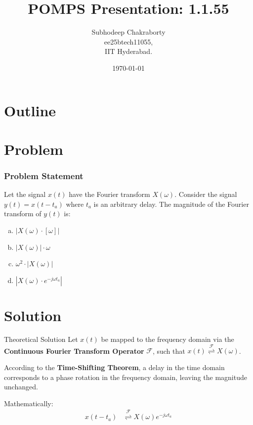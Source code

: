 \documentclass{beamer}
\title{POMPS Presentation: 1.1.55}
\author{Subhodeep Chakraborty \\ ee25btech11055,\\IIT Hyderabad.}
\date{\today}
\theoremstyle{remark}
\providecommand{\abs}[1]{\left\vert#1\right\vert}
\providecommand{\fourier}{\overset{\mathcal{F}}{ \rightleftharpoons}}
\numberwithin{equation}{section}
\begin{document}
\begin{frame}
\titlepage
\end{frame}

\section*{Outline}
\begin{frame}
\tableofcontents
\end{frame}

\section{Problem}
\begin{frame}
\frametitle{Problem Statement}
Let the signal $x(t)$ have the Fourier transform $X(\omega)$.
Consider the signal $y(t) = x(t-t_a)$ where $t_a$ is an arbitrary delay.
The magnitude of the Fourier transform of $y(t)$ is:
\vspace{0.5cm}
\begin{enumerate}[(a)]
    \item $\abs{X(\omega) \cdot [\omega]}$
    \item $\abs{X(\omega)} \cdot \omega$
    \item $\omega^2 \cdot \abs{X(\omega)}$
    \item $\abs{X(\omega) \cdot e^{-j\omega t_a}}$
\end{enumerate}
\end{frame}

\section{Solution}
\begin{frame}{Theoretical Solution}
Let $x(t)$ be mapped to the frequency domain via the \textbf{Continuous Fourier Transform Operator} $\mathcal{F}$, such that $x(t) \fourier X(\omega)$.
\vspace{0.5cm}

According to the \textbf{Time-Shifting Theorem}, a delay in the time domain corresponds to a phase rotation in the frequency domain, leaving the magnitude unchanged.
\vspace{0.5cm}

Mathematically:
\begin{align}
    x(t - t_a) &\fourier X(\omega)e^{-j\omega t_a}
    \label{eq:phase}
\end{align}
\end{frame}
\end{document}
